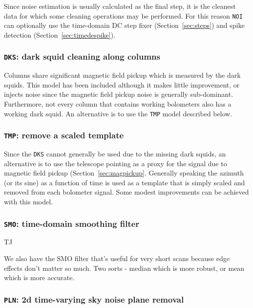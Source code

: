 \documentclass[useAMS,usenatbib,nofootinbib]{mn2e}
\begin{document}
Since noise estimation is usually calculated as the final step, it is
the cleanest data for which some cleaning operations may be
performed. For this reason \texttt{NOI} can optionally use the
time-domain DC step fixer (Section~\ref{sec:steps}) and spike
detection (Section~\ref{sec:timedespike}).

\subsubsection{\texttt{DKS}: dark squid cleaning along columns}
\label{sec:dks}

Columns share significant magnetic field pickup which is measured by
the dark squids. This model has been included although it makes little
improvement, or injects noise since the magnetic field pickup noise is
generally sub-dominant. Furthermore, not every column that contains
working bolometers also has a working dark squid. An alternative is to
use the \texttt{TMP} model described below.

\subsubsection{\texttt{TMP}: remove a scaled template}

Since the \texttt{DKS} cannot generally be used due to the missing
dark squids, an alternative is to use the telescope pointing as a
proxy for the signal due to magnetic field pickup
(Section~\ref{sec:magpickup}. Generally speaking the azimuth (or its
sine) as a function of time is used as a template that is simply
scaled and removed from each bolometer signal. Some modest
improvements can be achieved with this model.

\subsubsection{\texttt{SMO}: time-domain smoothing filter}
\label{sec:smo}

TJ

We also have the SMO filter that's useful for very short scans
because edge effects don't matter so much. Two sorts - median which is
more robust, or mean which is more accurate.

\subsubsection{\texttt{PLN}: 2d time-varying sky noise plane removal}
\label{sec:pln}
\end{document}
